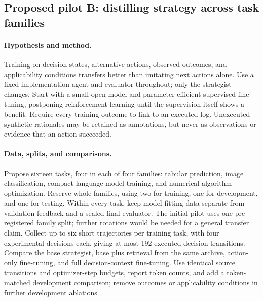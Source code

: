 \subsection{Proposed pilot B: distilling strategy across task families}

\paragraph{Hypothesis and method.}
Training on decision states, alternative actions, observed outcomes, and applicability conditions transfers better than imitating next actions alone. Use a fixed implementation agent and evaluator throughout; only the strategist changes. Start with a small open model and parameter-efficient supervised fine-tuning, postponing reinforcement learning until the supervision itself shows a benefit. Require every training outcome to link to an executed log. Unexecuted synthetic rationales may be retained as annotations, but never as observations or evidence that an action succeeded.

\paragraph{Data, splits, and comparisons.}
Propose sixteen tasks, four in each of four families: tabular prediction, image classification, compact language-model training, and numerical algorithm optimization. Reserve whole families, using two for training, one for development, and one for testing. Within every task, keep model-fitting data separate from validation feedback and a sealed final evaluator. The initial pilot uses one pre-registered family split; further rotations would be needed for a general transfer claim. Collect up to six short trajectories per training task, with four experimental decisions each, giving at most 192 executed decision transitions. Compare the base strategist, base plus retrieval from the same archive, action-only fine-tuning, and full decision-context fine-tuning. Use identical source transitions and optimizer-step budgets, report token counts, and add a token-matched development comparison; remove outcomes or applicability conditions in further development ablations.

